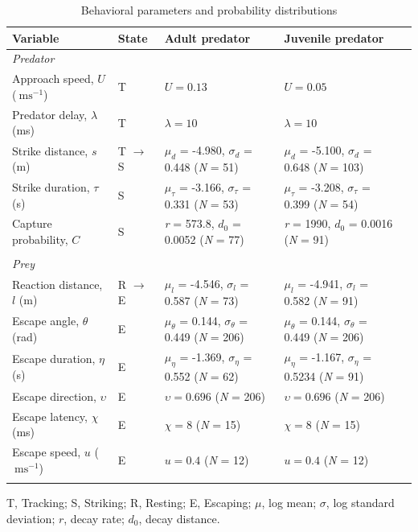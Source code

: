 \documentclass[]{rsos}%
\begin{document}
\linespread{1.3}\selectfont %

\begin{table}[!h]
\scriptsize
\caption{Behavioral parameters and probability distributions}%
\begin{tabular}{lllll}%
\hline
Variable &State &Adult predator & Juvenile predator\\
\hline
\textit{Predator}& & & & \\
Approach speed, $U$ ($\SI{}{\m\s} ^{-1}$) &T &$U = 0.13$ & $U = 0.05$ \\
Predator delay, $\lambda$ (ms) &T &$\lambda = 10$ &$\lambda = 10$ \\
Strike distance, $s$ (m) &T $\to$ S &$\mu_d$ = -4.980, $\sigma_d$ = 0.448 (\textit{N} = 51) & $\mu_d$ = -5.100, $\sigma_d$ = 0.648 (\textit{N} = 103)\\
Strike duration, $\tau$ (s) &S &$\mu_{\tau}$ = -3.166, $\sigma_{\tau}$ = 0.331 (\textit{N} = 53) & $\mu_{\tau}$ = -3.208, $\sigma_{\tau}$ = 0.399 (\textit{N} = 54) \\
Capture probability, $C$ &S &\textit{r} = 573.8, \textit{$d_0$} = 0.0052  (\textit{N} = 77) &\textit{r} = 1990, \textit{$d_0$} = 0.0016  (\textit{N} = 91) \\ \\
\textit{Prey}& & & & \\
Reaction distance, $l$ (m) &R $\to$ E &$\mu_l$ = -4.546, $\sigma_l$ = 0.587 (\textit{N} = 73) &$\mu_l$ = -4.941, $\sigma_l$ = 0.582 (\textit{N} = 91) \\
Escape angle, $\theta$ (rad) &E  &$\mu_{\theta}$ = 0.144, $\sigma_{\theta}$ = 0.449 (\textit{N} = 206) &$\mu_{\theta}$ = 0.144, $\sigma_{\theta}$ = 0.449 (\textit{N} = 206) \\
Escape duration, $\eta$ (s) &E &$\mu_{\eta}$ = -1.369, $\sigma_{\eta}$ = 0.552 (\textit{N} = 62) &$\mu_{\eta}$ = -1.167, $\sigma_{\eta}$ = 0.5234 (\textit{N} = 91) \\
Escape direction, $\upsilon$ &E &$\upsilon=0.696$ (\textit{N} = 206) &$\upsilon=0.696$ (\textit{N} = 206) \\
Escape latency, $\chi$ (ms) &E &$\chi = 8$ (\textit{N} = 15) & $\chi = 8$ (\textit{N} = 15)\\
Escape speed, $u$ ($\SI{}{\m\s} ^{-1}$) &E  &$u = 0.4$ (\textit{N} = 12) &$u = 0.4$ (\textit{N} = 12) \\\hline
\label{table}
\end{tabular}

T, Tracking; S, Striking; R, Resting; E, Escaping; $\mu$, log mean; $\sigma$, log standard deviation; $r$, decay rate; $d_0$, decay distance.
\end{table}%
\end{document}
